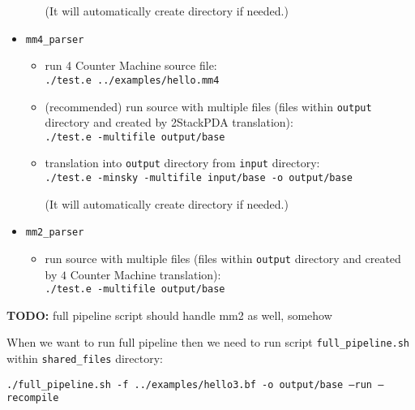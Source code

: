 \documentclass[english,shortabstract,mgr]{iithesis}
\newcommand{\todo}[1]{\textbf{TODO:} #1}
\begin{document}
\begin{itemize}
\begin{itemize}
        (It will automatically create directory if needed.)
    \end{itemize}
  \item \texttt{mm4\_parser}
    \begin{itemize}
      \item run 4 Counter Machine source file: \\ \texttt{./test.e ../examples/hello.mm4}
      \item (recommended) run source with multiple files (files within \texttt{output}
        directory and created by 2StackPDA translation): \\ \texttt{./test.e -multifile output/base}
      \item translation into \texttt{output} directory from \texttt{input}
        directory: \\ \texttt{./test.e -minsky -multifile input/base -o output/base}

        (It will automatically create directory if needed.)
    \end{itemize}
  \item \texttt{mm2\_parser}
    \begin{itemize}
      \item run source with multiple files (files within \texttt{output}
        directory and created by $4$ Counter Machine translation): \\ \texttt{./test.e -multifile output/base}
    \end{itemize}
\end{itemize}

\todo{full pipeline script should handle mm2 as well, somehow}

When we want to run full pipeline then we need to run script \texttt{full\_pipeline.sh} within
\texttt{shared\_files} directory:

\hspace{-1.25cm}
\texttt{./full\_pipeline.sh -f ../examples/hello3.bf -o output/base --run --recompile}
\end{document}
